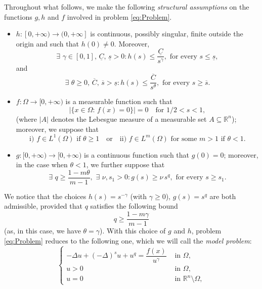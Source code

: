 \documentclass[11pt,a4paper]{amsart}
\def \R {\mathbb{R}}
\theoremstyle{definition}
\theoremstyle{plain}
\numberwithin{equation}{section}
\begin{document}
Throughout what follows, we make
the following \emph{structural assumptions} on the functions $g,h$ and $f$
involved in problem \eqref{eq:Problem}.
\begin{itemize}
\item[(H)$_h$] $h:[0,+\infty)\to (0,+\infty]$ is continuous, possibly singular, finite outside the origin and such that $h(0)\neq 0$. Moreover,
\begin{equation}\label{eq:assh1}\tag{h1}
\exists\,\,\gamma \in [0,1],\,\underline{C},\,\underline{s}>0: h(s) \leq \dfrac{\underline{C}}{s^{\gamma}}, \textrm{ for every } s \leq \underline{s},
\end{equation}
\noindent and
\begin{equation}\label{eq:assh2}\tag{h2}
\exists\,\,\theta \geq 0,\,\overline{C},\,\overline{s}>\underline{s}: h(s) \leq \dfrac{\overline{C}}{s^{\theta}}, \textrm{ for every } s \geq \overline{s}.
\end{equation}
	\item[(H)$_f$]  $f:\Omega\to[0,+\infty)$ is a measurable function such that \begin{equation} \label{eq:assumptionMeasurefzero}
  |\{x\in\Omega:\,f(x) = 0\}| = 0 \quad \textrm{for } 1/2<s<1, 
 \end{equation}
(where $|A|$ denotes the Lebesgue measure of a measurable set $A\subseteq\R^n$);
moreover, we suppose that
$$\mathrm{i)}\,\,\text{$f\in L^1(\Omega)$ if $\theta\geq 1$}\quad\text{or}\quad
\mathrm{ii)}\,\,\text{$f\in L^m(\Omega)$ for some $m > 1$ if $\theta < 1$}.$$

 \item[(H)$_g$] $g:[0,+\infty)\to [0,+\infty)$ is a  continuous function such that $g(0)=0$; moreover, in the case when $\theta < 1$, we further suppose that
\vspace{0.1cm}
\begin{equation}\tag{g1}
\exists\,\,q \geq \dfrac{1-m\theta}{m-1},\,\, \exists\,\,\nu, s_1>0: g(s) \geq \nu \, s^q, \textrm{ for every } s \geq s_1.
\end{equation}
\end{itemize}
We notice that the choices $h(s)= s^{-\gamma}$ (with $\gamma\geq 0$), $g(s) = s^q$ are both admissible, provided that $q$ satisfies the following bound
$$q\geq \frac{1-m\gamma}{m-1}$$
(as, in this case, we have $\theta = \gamma$). With this choice of 
$g$ and $h$, problem \eqref{eq:Problem} reduces to the following one,
which we will call the {\em model problem}:
\begin{equation}\label{eq:ModelProblem}
\left\{ \begin{array}{rl}
-\Delta u + (-\Delta)^s u + u^q = \dfrac{f(x)}{u^{\gamma}} & \textrm{ in } \Omega,\\
u>0 & \textrm{ in } \Omega,\\
u=0 & \textrm{ in } \mathbb{R}^{n}\setminus \Omega,
\end{array}\right.
\end{equation}
\end{document}
